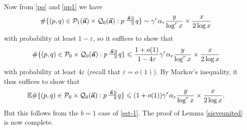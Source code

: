 \documentclass[12pt]{amsart}
\numberwithin{equation}{section}  %
\theoremstyle{remark}
\theoremstyle{plain}
\numberwithin{equation}{section}
\newcommand{\E}{\mathbb{E}}  %
\newcommand{\eps}{\ensuremath{\varepsilon}}
\renewcommand{\leq}{\leqslant}
\renewcommand{\(}{\left(}
\renewcommand{\)}{\right)}
\newcommand{\asym}{\sim}   %
\newcommand{\rel}{\nsststile{}{}}  %
\newcommand{\relra}{\nsdtstile{}{\vect{\mathbf{a}}}} %
\newcommand{\vect}[1]{{\ensuremath{\vec{#1}}}}
\newcommand{\PP}{\mathcal{P}}
\newcommand{\QQ}{\mathcal{Q}}
\newcommand{\main}{\operatorname{main}}
\begin{document}
Now from \eqref{po} and \eqref{pp1} we have
$$ 
\#  \{ (p,q) \in \PP_1(\vect{\mathbf{a}}) \times \QQ_0(\vect{\mathbf{a}}):  p \relra q \} \asym \gamma^r\alpha_r\frac y{\log^r x} \times \frac{x}{2\log x}  
$$
with probability at least $1-\eps$, so it suffices to show that
$$ 
\#  \{ (p,q) \in \PP_0 \times \QQ_0(\vect{\mathbf{a}}):  p \relra q \} \leq \frac{1+o(1)}{1-4\eps} \gamma^r\alpha_r\frac y{\log^r x} \times \frac{x}{2\log x}  
$$
with probability at least $4\eps$ (recall that $\eps=o(1)$).  By Markov's inequality, it thus suffices to show that
$$ 
\E \#  \{ (p,q) \in \PP_0 \times \QQ_0(\vect{\mathbf{a}}):  p \relra q \} \leq (1+o(1)) \gamma^r\alpha_r\frac y{\log^r x} \times \frac{x}{2\log x}.
$$
But this follows from the $b=1$ case of \eqref{est-1}.  The proof of Lemma \ref{sieveunited} is now complete.

\begin{comment}
\begin{proof}[Proof of Lemma \ref{sieveunited}] To begin with we select $\vect{\mathbf{a}}$ uniformly at random. Choose $P_2(\vect{\mathbf{a}})$ to be the set of $p \in P_0$ for which Lemma \ref{QQ1p_normal} holds, thus
\[ |Q_1(p;\vect{\mathbf{a}})| \rel \alpha_r \gamma^r \frac{y}{(\log x)^r} \rel \gamma^r |Q_0(p)|.\]
Let $R''_2(\vect{\mathbf{a}})$ be the set of all $q \in R^{\main}_2(\vect{\mathbf{a}})$ such that Lemma \ref{PP1qi} holds for \emph{all} $i = 0,1,2,\dots, r-1$, thus
\[ |P_1(q,i;\vect{\mathbf{a}})| \rel \gamma^{r-1} \alpha_r \frac{x}{2(\log x)^r} \rel \gamma^{r-1}|P_0(q,i)|.\]
Then parts (1), (2) and (3) of the lemma hold with probability $1 - o(1)$ in $\vect{\mathbf{a}}$, this being a consequence of Lemmas \ref{QQ1_normal}, \ref{QQ1p_normal} and \ref{PP1qi}. Part (4) does not quite hold as stated: we instead have the weaker property that for any $i \in \{0,1,\dots, r-1\}$ and any $q \in R''_2(\vect{\mathbf{a}})$ we have
\begin{equation}\label{eq460} |P_1(q,i;\vect{\mathbf{a}})| \rel \gamma^{r-1}\alpha_r \frac{x}{2(\log x)^r}.\end{equation}
Recall that we in fact claimed the stronger estimate
\begin{equation}\label{stronger} |P_2(\vect{\mathbf{a}}) \cap P_1(q,i;\vect{\mathbf{a}})| \rel \gamma^{r-1}\alpha_r \frac{x}{2(\log x)^r}.\end{equation}
To establish this we need some further technical arguments and will in fact need to make a specific choice of $\vect{\mathbf{a}}$ and then to refine $R''_2(\vect{\mathbf{a}})$ somewhat further. We claim first of all that there is a choice of $\vect{\mathbf{a}}$ such that we have


\end{comment}
\end{document}
